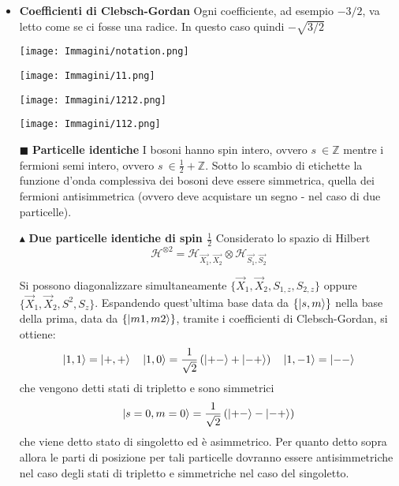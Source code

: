 \documentclass{book}
\newcommand{\g}{\textbf}
\newcommand{\e}{\begin{equation}}
\newcommand{\ex}{\end{equation} }
\renewcommand{\it}{\item[$\cdot$]}
\begin{document}
\begin{multicols}{4}
\begin{itemize}
        \it \g{Coefficienti di Clebsch-Gordan} Ogni coefficiente, ad esempio $-3/2$, va letto come se ci fosse una radice. In questo caso quindi $-\sqrt{3/2}$
         \begin{minipage}[t]{1.1\linewidth}
        \centering
        \begin{minipage}[t]{0.3\linewidth} %
            \centering
            \texttt{[image: Immagini/notation.png]}
        \end{minipage}%
        \hfill
        \begin{minipage}[t]{0.7\linewidth} %
            \centering
            \texttt{[image: Immagini/11.png]}
        \end{minipage}
    \end{minipage}
 
    \begin{minipage}[t]{1.05\linewidth}
        \centering
        \begin{minipage}[t]{0.42\linewidth} %
            \centering
            \texttt{[image: Immagini/1212.png]}
        \end{minipage}%
        \begin{minipage}[t]{0.62\linewidth} %
            \centering
            \texttt{[image: Immagini/112.png]}
        \end{minipage}
    \end{minipage}
    
\item [$\blacksquare$] \g{Particelle identiche }
I bosoni hanno spin intero, ovvero $s \ \in \mathbb{Z}$ mentre i fermioni semi intero, ovvero $s \ \in \frac{1}{2} + \mathbb{Z}$.
Sotto lo scambio di etichette la funzione d'onda complessiva dei bosoni deve essere simmetrica, quella dei fermioni antisimmetrica (ovvero deve acquistare un segno - nel caso di due particelle). 

\item [$\blacktriangle$] \g{Due particelle identiche di spin $\frac{1}{2}$}
Considerato lo spazio di Hilbert
\e{\mathcal{H}^{\otimes 2} = \mathcal{H}_{\vec{X_{1}}, \vec{X_{2}}} \otimes \mathcal{H}_{\vec{S_{1}}, 
\vec{S_{2}} }}\ex

Si possono diagonalizzare simultaneamente 
$ \{ \vec{X}_1, \vec{X}_2, S_{1,z}, S_{2,z} \}$ oppure $ \{ \vec{X}_1, \vec{X}_2, S^{2}, S_{z} \}$. Espandendo quest'ultima base data da $\{\ket{s,m}\}$ nella base della prima, data da $\{\ket{m1, m2}\}$, tramite i coefficienti di Clebsch-Gordan, si ottiene:
\e{\ket{1,1} = \ket{+,+} \quad \ket{1,0} = \frac{1}{\sqrt{2}}\left(\ket{+-} + \ket{-+}\right) \quad \ket{1,-1} = \ket{--}}\ex
che vengono detti stati di tripletto e sono simmetrici
\e{\ket{s=0,m=0} = \frac{1}{\sqrt{2}}\left(\ket{+-} - \ket{-+}\right)}\ex
che viene detto stato di singoletto ed è asimmetrico. 
Per quanto detto sopra allora le parti di posizione per tali particelle dovranno essere antisimmetriche nel caso degli stati di tripletto e simmetriche nel caso del singoletto. 


\end{itemize}
\end{multicols}
\end{document}
